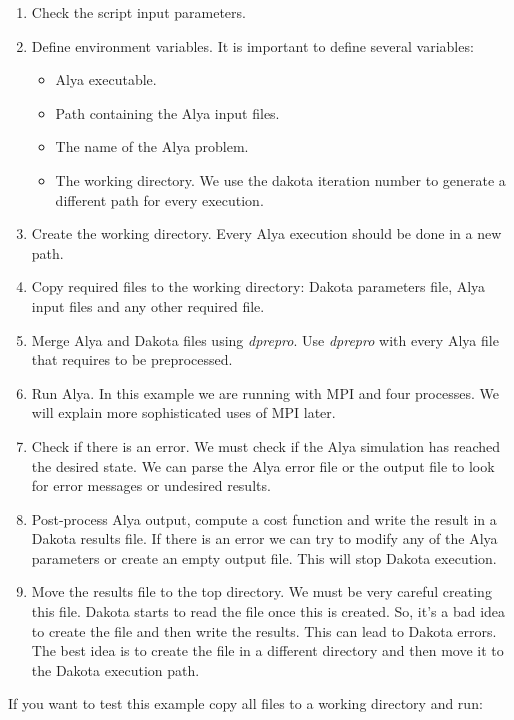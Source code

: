 \documentclass[12pt,a4paper,article]{memoir}
\begin{document}
\begin{enumerate}[label=Step \arabic*:,align=right,labelwidth=2.0cm,leftmargin=2.0cm]
\item Check the script input parameters.
\item Define environment variables. It is important to define several variables:
\begin{itemize}
\item Alya executable.
\item Path containing the Alya input files.
\item The name of the Alya problem.
\item The working directory. We use the dakota iteration number to generate a different path for every execution.
\end{itemize}
\item Create the working directory. Every Alya execution should be done in a new path.
\item Copy required files to the working directory: Dakota parameters file, Alya input files and any other required file.
\item Merge Alya and Dakota files using \textit{dprepro}. Use \textit{dprepro} with every Alya file that requires to be preprocessed.
\item Run Alya. In this example we are running with MPI and four processes. We will explain more sophisticated uses of MPI later.
\item Check if there is an error. We must check if the Alya simulation has reached the desired state. We can parse the Alya error file or the output file to look for error messages or undesired results.
\item Post-process Alya output, compute a cost function and write the result in a Dakota results file. If there is an error we can try to modify any of the Alya parameters or create an empty output file. This will stop Dakota execution.
\item Move the results file to the top directory. We must be very careful creating this file. Dakota starts to read the file once this is created. So, it's a bad idea to create the file and then write the results. This can lead to Dakota errors. The best idea is to create the file in a different directory and then move it to the Dakota execution path.
\end{enumerate}

If you want to test this example copy all files to a working directory and run:
\end{document}
